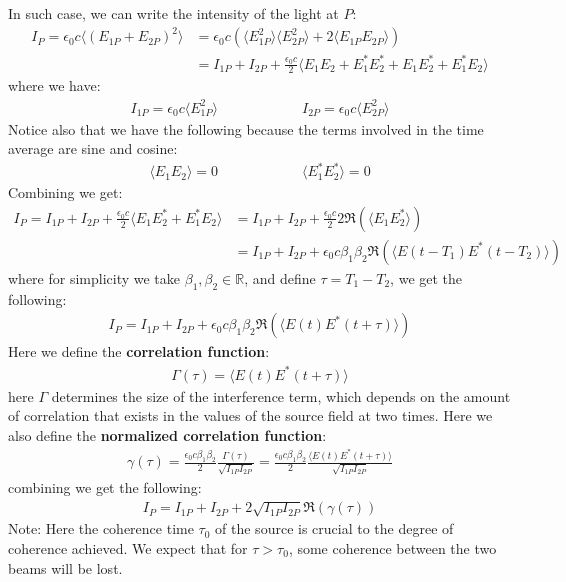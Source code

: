 \documentclass[11pt]{book}
\theoremstyle{break}
\theoremstyle{break}
\newcommand{\R}{\mathbb{R}}
\newcommand{\note}{\color{red}Note: \color{black}}
\begin{document}
In such case, we can write the intensity of the light at $P$:
\begin{align*}
I_P = \epsilon_0 c\langle (E_{1P}+E_{2P})^2\rangle &= \epsilon_0 c \left( \langle E_{1P}^2\rangle \langle E_{2P}^2\rangle+ 2\langle E_{1P}E_{2P}\rangle \right) \\
&=  I_{1P}+I_{2P}+ \frac{\epsilon_0 c}{2}\langle E_1E_2 + E_1^*E_2^* + E_1E_2^*+E_1^*E_2\rangle
\end{align*}
where we have:
\begin{align*}
I_{1P} = \epsilon_0 c\langle E_{1P}^2\rangle \qquad\qquad\qquad I_{2P} = \epsilon_0 c\langle E_{2P}^2 \rangle
\end{align*}
Notice also that we have the following because the terms involved in the time average are sine and cosine:
\begin{align*}
\langle E_1E_2\rangle = 0 \qquad\qquad\qquad \langle E_1^* E_2^*\rangle = 0
\end{align*}
Combining we get:
\begin{align*}
I_P = I_{1P} + I_{2P} + \frac{\epsilon_0 c}{2}\langle E_1 E_2^* +E_1^* E_2\rangle &= I_{1P} + I_{2P} + \frac{\epsilon_0 c}{2}2\Re(\langle E_1 E_2^*\rangle)\\
&= I_{1P} + I_{2P} +\epsilon_0 c\beta_1 \beta_2 \Re(\langle E(t-T_1) E^*(t-T_2)\rangle)
\end{align*}
where for simplicity we take $\beta_1,\beta_2 \in \R$, and define $\tau = T_1 - T_2$, we get the following:
\begin{align*}
I_P = I_{1P} + I_{2P} + \epsilon_0 c \beta_1 \beta_2 \Re(\langle E(t) E^*(t+ \tau)\rangle)
\end{align*}
Here we define the \textbf{correlation function}:
\begin{align*}
\Gamma(\tau) = \langle E(t) E^*(t+\tau)\rangle
\end{align*}
here $\Gamma$ determines the size of the interference term, which depends on the amount of correlation that exists in the values of the source field at two times. Here we also define the \textbf{normalized correlation function}:
\begin{align*}
\gamma(\tau) = \frac{\epsilon_0 c\beta_1\beta_2}{2}\frac{\Gamma(\tau)}{\sqrt{I_{1P}I_{2P}}} = \frac{\epsilon_0 c\beta_1\beta_2}{2}\frac{ \langle E(t) E^*(t+\tau)\rangle  }{\sqrt{I_{1P}I_{2P}}} 
\end{align*}
combining we get the following:
\begin{align}
I_P = I_{1P}+ I_{2P} + 2\sqrt{I_{1P}I_{2P}} \Re(\gamma(\tau))
\end{align}
\note Here the coherence time $\tau_0$
of the source is crucial to the degree of coherence achieved. We expect that for $\tau>\tau_0$, some coherence between the two beams will be lost. \\
\end{document}
